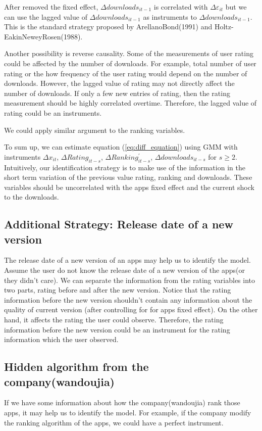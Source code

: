 \documentclass[11pt,twoside]{article}
\begin{document}
	After removed the fixed effect, $\Delta downloads_{it-1}$ is correlated with $\Delta \varepsilon_{it}$ but we can use the lagged value of  $\Delta downloads_{it-1}$ as instruments to $\Delta downloads_{it-1}$. This is the standard strategy proposed by ArellanoBond(1991) and Holtz-EakinNeweyRosen(1988). 
	
	
	Another possibility is reverse causality. Some of the measurements of user rating could be affected by the number of downloads. For example, total number of user rating or the how frequency of the user rating would depend on the number of downloads. However, the lagged value of rating may not directly affect the number of downloads. If only a few new entries of rating, then the rating measurement should be highly correlated overtime. Therefore, the lagged value of rating could be an instruments. 
	
	We could apply similar argument to the ranking variables. 
	
	To sum up, we can estimate equation (\ref{eq:diff_equation}) using GMM with instruments $\Delta x_{it}$, $\Delta Rating_{it-s} $, $\Delta Ranking_{it-s}^{'} $, $ \Delta downloads_{it-s}$ for $s\geq 2$.
	Intuitively, our identification strategy is to make use of the information in the short term variation of the previous value rating, ranking and downloads. These variables should be uncorrelated with the apps fixed effect and the current shock to the downloads.
	
\subsection{Additional Strategy: Release date of a new version}
The release date of a new version of an apps may help us to identify the model. Assume the user do not know the release date of a new version of the apps(or they didn't care). We can separate the information from the rating variables into two parts, rating before and after the new version. Notice that the rating information before the new version shouldn't contain any information about the quality of current version (after controlling for for apps fixed effect). On the other hand, it affects the rating the user could observe. Therefore, the rating information before the new version could be an instrument for the rating information which the user observed. 

\subsection{Hidden algorithm from the company(wandoujia)}
If we have some information about how the company(wandoujia) rank those apps, it may help us to identify the model. For example, if the company modify the ranking algorithm of the apps, we could have a perfect instrument. 
\end{document}
